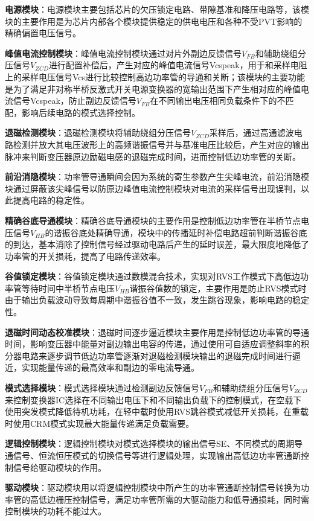 \textbf{电源模块}：电源模块主要包括芯片的欠压锁定电路、带隙基准和降压电路等，该模块的主要作用是为芯片内部各个模块提供稳定的供电电压和各种不受PVT影响的精确偏置电压信号。

\textbf{峰值电流控制模块}：峰值电流控制模块通过对片外副边反馈信号$V_{FB}$和辅助绕组分压信号$V_{ZCD}$进行配置补偿后，产生对应的峰值电流信号Vcspeak，用于和采样电阻上的采样电压信号Vcs进行比较控制高边功率管的导通和关断；该模块的主要功能是为了满足非对称半桥反激式开关电源变换器的宽输出范围下产生相对应的峰值电流信号Vcspeak，防止副边反馈信号$V_{FB}$在不同输出电压相同负载条件下的不匹配，影响后续电路的模式选择控制。

\textbf{退磁检测模块}：退磁检测模块将辅助绕组分压信号$V_{ZCD}$采样后，通过高通滤波电路检测并放大其电压波形上的高频谐振信号并与基准电压比较后，产生对应的输出脉冲来判断变压器原边励磁电感的退磁完成时间，进而控制低边功率管的关断。

\textbf{前沿消隐模块}：功率管导通瞬间会因为系统的寄生参数产生尖峰电流，前沿消隐模块通过屏蔽该尖峰信号以防原边峰值电流控制模块对电流的采样信号出现误判，以此提高电路的稳定性。

\textbf{精确谷底导通模块}：精确谷底导通模块的主要作用是控制低边功率管在半桥节点电压信号$V_{HB}$的谐振谷底处精确导通，模块中的传播延时补偿电路超前判断谐振谷底的到达，基本消除了控制信号经过驱动电路后产生的延时误差，最大限度地降低了功率管的开关损耗，提高了电路传递效率。

\textbf{谷值锁定模块}：谷值锁定模块通过数模混合技术，实现对RVS工作模式下高低边功率管等待时间中半桥节点电压$V_{HB}$谐振谷值数的锁定，主要作用是防止RVS模式时由于输出负载波动导致每周期中谐振谷值不一致，发生跳谷现象，影响电路的稳定性。

\textbf{退磁时间动态校准模块}：退磁时间逐步逼近模块主要作用是控制低边功率管的导通时间，影响变压器中能量对副边输出电容的传递，通过使用可自适应调整斜率的积分器电路来逐步调节低边功率管逐渐对退磁检测模块输出的退磁完成时间进行逼近，实现能量传递的最高效率和副边的零电流导通。

\textbf{模式选择模块}：模式选择模块通过检测副边反馈信号$V_{FB}$和辅助绕组分压信号$V_{ZCD}$来控制变换器IC选择在不同输出电压下和不同输出负载下的控制模式，在空载下使用突发模式降低待机功耗，在轻中载时使用RVS跳谷模式减低开关损耗，在重载时使用CRM模式实现最大能量传递满足负载需要。

\textbf{逻辑控制模块}：逻辑控制模块对模式选择模块的输出信号SE、不同模式的周期导通信号、恒流恒压模式的切换信号等进行逻辑处理，实现输出高低边功率管通断控制信号给驱动模块的作用。

\textbf{驱动模块}：驱动模块用以将逻辑控制模块中所产生的功率管通断控制信号转换为功率管的高低边栅压控制信号，满足功率管所需的大驱动能力和低导通损耗，同时需控制模块的功耗不能过大。

